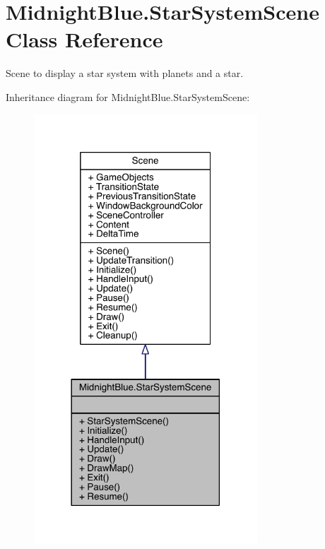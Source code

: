 \hypertarget{class_midnight_blue_1_1_star_system_scene}{}\section{Midnight\+Blue.\+Star\+System\+Scene Class Reference}
\label{class_midnight_blue_1_1_star_system_scene}


Scene to display a star system with planets and a star.  




Inheritance diagram for Midnight\+Blue.\+Star\+System\+Scene\+:\nopagebreak
\begin{figure}[H]
\begin{center}
\leavevmode
\includegraphics[width=237pt]{class_midnight_blue_1_1_star_system_scene__inherit__graph}
\end{center}
\end{figure}


